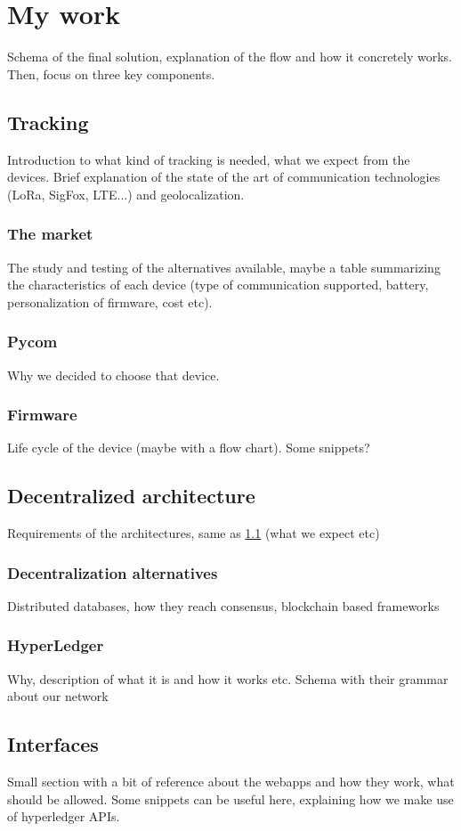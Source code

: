 \chapter{My work}
\label{cha:main}
Schema of the final solution, explanation of the flow and how it concretely works. Then, focus on three key components.

\section{Tracking}
\label{sec:tracking}
Introduction to what kind of tracking is needed, what we expect from the devices. Brief explanation of the state of the art of communication technologies (LoRa, SigFox, LTE...) and geolocalization.

\subsection{The market}
\label{sec:track_market}
The study and testing of the alternatives available, maybe a table summarizing the characteristics of each device (type of communication supported, battery, personalization of firmware, cost etc).

\subsection{Pycom}
\label{sec:track_choice}
Why we decided to choose that device.

\subsection{Firmware}
\label{sec:track_firmware}
Life cycle of the device (maybe with a flow chart). Some snippets?

\section{Decentralized architecture}
\label{sec:arch}
Requirements of the architectures, same as \ref{sec:tracking} (what we expect etc)

\subsection{Decentralization alternatives}
\label{sec:alternatives}
Distributed databases, how they reach consensus, blockchain based frameworks

\subsection{HyperLedger}
\label{sec:hyperledger}
Why, description of what it is and how it works etc. Schema with their grammar about our network


\section{Interfaces}
Small section with a bit of reference about the webapps and how they work, what should be allowed. Some snippets can be useful here, explaining how we make use of hyperledger APIs.

